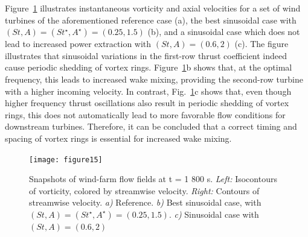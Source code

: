 \documentclass[wes, manuscript]{copernicus}
\begin{document}
Figure~\ref{fig:vorticity_parametersweep} illustrates instantaneous vorticity and axial velocities for a set of wind turbines of the aforementioned reference case (a), the best sinusoidal case with $(St, A) = (St^\star, A^\star)= (0.25, 1.5)$ (b), and a sinusoidal case which does not lead to increased power extraction with $(St, A) = (0.6, 2)$ (c). The figure illustrates that sinusoidal variations in the first-row thrust coefficient indeed cause periodic shedding of vortex rings. Figure~\ref{fig:vorticity_parametersweep}b shows that, at the optimal frequency, this leads to increased wake mixing, providing the second-row turbine with a higher incoming velocity. In contrast, Fig.~\ref{fig:vorticity_parametersweep}c shows that, even though higher frequency thrust oscillations also result in periodic shedding of vortex rings, this does not automatically lead to more favorable flow conditions for downstream turbines. Therefore, it can be concluded that a correct timing and spacing of vortex rings is essential for increased wake mixing.
\begin{figure}
	\centering
	\texttt{[image: figure15]}
	\caption{Snapshots of wind-farm flow fields at t = 1 800 s. \emph{Left: } Isocontours of vorticity, colored by streamwise velocity. \emph{Right: } Contours of streamwise velocity. \emph{a)} Reference. \emph{b)} Best sinusoidal case, with $(St , A) = (St^\star, A^\star) = (0.25, 1.5)$. \emph{c)} Sinusoidal case with $(St, A) = (0.6, 2)$ \label{fig:vorticity_parametersweep}  }
\end{figure}
\end{document}

